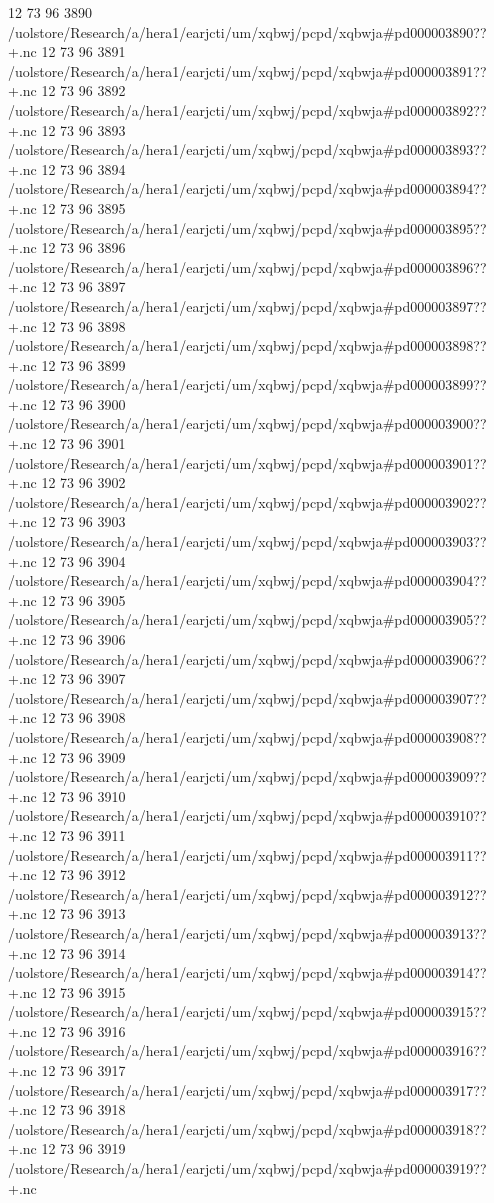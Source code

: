 12 73 96
3890
/uolstore/Research/a/hera1/earjcti/um/xqbwj/pcpd/xqbwja#pd000003890??+.nc
12 73 96
3891
/uolstore/Research/a/hera1/earjcti/um/xqbwj/pcpd/xqbwja#pd000003891??+.nc
12 73 96
3892
/uolstore/Research/a/hera1/earjcti/um/xqbwj/pcpd/xqbwja#pd000003892??+.nc
12 73 96
3893
/uolstore/Research/a/hera1/earjcti/um/xqbwj/pcpd/xqbwja#pd000003893??+.nc
12 73 96
3894
/uolstore/Research/a/hera1/earjcti/um/xqbwj/pcpd/xqbwja#pd000003894??+.nc
12 73 96
3895
/uolstore/Research/a/hera1/earjcti/um/xqbwj/pcpd/xqbwja#pd000003895??+.nc
12 73 96
3896
/uolstore/Research/a/hera1/earjcti/um/xqbwj/pcpd/xqbwja#pd000003896??+.nc
12 73 96
3897
/uolstore/Research/a/hera1/earjcti/um/xqbwj/pcpd/xqbwja#pd000003897??+.nc
12 73 96
3898
/uolstore/Research/a/hera1/earjcti/um/xqbwj/pcpd/xqbwja#pd000003898??+.nc
12 73 96
3899
/uolstore/Research/a/hera1/earjcti/um/xqbwj/pcpd/xqbwja#pd000003899??+.nc
12 73 96
3900
/uolstore/Research/a/hera1/earjcti/um/xqbwj/pcpd/xqbwja#pd000003900??+.nc
12 73 96
3901
/uolstore/Research/a/hera1/earjcti/um/xqbwj/pcpd/xqbwja#pd000003901??+.nc
12 73 96
3902
/uolstore/Research/a/hera1/earjcti/um/xqbwj/pcpd/xqbwja#pd000003902??+.nc
12 73 96
3903
/uolstore/Research/a/hera1/earjcti/um/xqbwj/pcpd/xqbwja#pd000003903??+.nc
12 73 96
3904
/uolstore/Research/a/hera1/earjcti/um/xqbwj/pcpd/xqbwja#pd000003904??+.nc
12 73 96
3905
/uolstore/Research/a/hera1/earjcti/um/xqbwj/pcpd/xqbwja#pd000003905??+.nc
12 73 96
3906
/uolstore/Research/a/hera1/earjcti/um/xqbwj/pcpd/xqbwja#pd000003906??+.nc
12 73 96
3907
/uolstore/Research/a/hera1/earjcti/um/xqbwj/pcpd/xqbwja#pd000003907??+.nc
12 73 96
3908
/uolstore/Research/a/hera1/earjcti/um/xqbwj/pcpd/xqbwja#pd000003908??+.nc
12 73 96
3909
/uolstore/Research/a/hera1/earjcti/um/xqbwj/pcpd/xqbwja#pd000003909??+.nc
12 73 96
3910
/uolstore/Research/a/hera1/earjcti/um/xqbwj/pcpd/xqbwja#pd000003910??+.nc
12 73 96
3911
/uolstore/Research/a/hera1/earjcti/um/xqbwj/pcpd/xqbwja#pd000003911??+.nc
12 73 96
3912
/uolstore/Research/a/hera1/earjcti/um/xqbwj/pcpd/xqbwja#pd000003912??+.nc
12 73 96
3913
/uolstore/Research/a/hera1/earjcti/um/xqbwj/pcpd/xqbwja#pd000003913??+.nc
12 73 96
3914
/uolstore/Research/a/hera1/earjcti/um/xqbwj/pcpd/xqbwja#pd000003914??+.nc
12 73 96
3915
/uolstore/Research/a/hera1/earjcti/um/xqbwj/pcpd/xqbwja#pd000003915??+.nc
12 73 96
3916
/uolstore/Research/a/hera1/earjcti/um/xqbwj/pcpd/xqbwja#pd000003916??+.nc
12 73 96
3917
/uolstore/Research/a/hera1/earjcti/um/xqbwj/pcpd/xqbwja#pd000003917??+.nc
12 73 96
3918
/uolstore/Research/a/hera1/earjcti/um/xqbwj/pcpd/xqbwja#pd000003918??+.nc
12 73 96
3919
/uolstore/Research/a/hera1/earjcti/um/xqbwj/pcpd/xqbwja#pd000003919??+.nc
